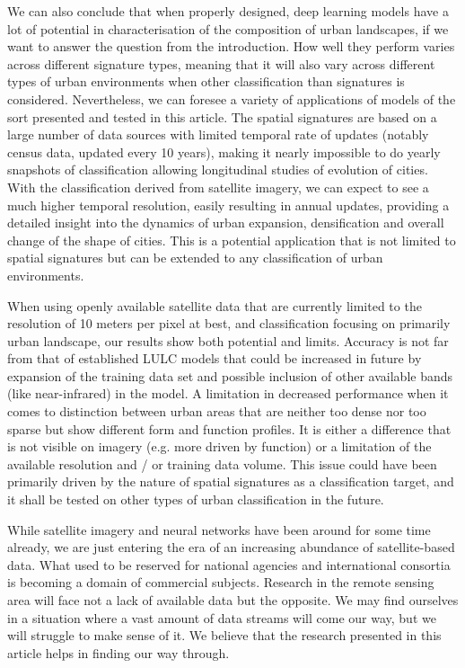 We can also conclude that when properly designed, deep learning models have a lot of potential
in characterisation of the composition of urban landscapes, if we want to answer the question
from the introduction. How well they perform varies across different signature types, meaning that
it will also vary across different types of urban environments when other classification than
signatures is considered. Nevertheless, we can foresee a variety of applications of
models of the sort presented and tested in this article. The spatial signatures are based on
a large number of data sources with limited temporal rate of updates (notably census data, updated every 10 years), making it nearly impossible to do yearly snapshots
of classification allowing longitudinal studies of evolution of cities. With the classification
derived from satellite imagery, we can expect to see a much higher temporal resolution,
easily resulting in annual updates, providing a detailed insight into the dynamics of urban
expansion, densification and overall change of the shape of cities. This is a potential
application that is not limited to spatial signatures but can be extended to any
classification of urban environments.


When using openly available satellite data that are currently limited to the resolution
of 10 meters per pixel at best, and classification focusing on primarily urban landscape,
our results show both potential and limits. Accuracy is not far from
that of established LULC models that could be increased in future by expansion of the training
data set and possible inclusion of other available bands (like near-infrared) in the model.
A limitation in decreased performance when it comes to distinction between urban areas that
are neither too dense nor too sparse but show different form and function profiles. It is
either a difference that is not visible on imagery (e.g. more driven by function) or a
limitation of the available resolution and / or training data volume. This issue could have
been primarily driven by the nature of spatial signatures as a classification target, and
it shall be tested on other types of urban classification in the future.

While satellite imagery and neural networks have been around for some time already, we
are just entering the era of an increasing abundance of satellite-based data. What used
to be reserved for national agencies and international consortia is becoming a domain of
commercial subjects. Research in the remote sensing area will face not a lack of
available data but the opposite. We may find ourselves in a situation where a vast
amount of data streams will come our way, but we will struggle to make sense of it. We
believe that the research presented in this article helps in finding our way through.
